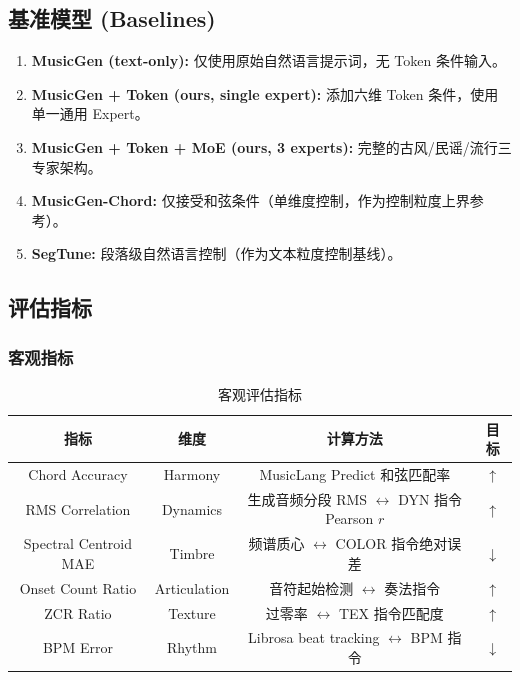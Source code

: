 \documentclass[12pt,a4paper]{article}
\begin{document}
\subsection{基准模型 (Baselines)}

\begin{enumerate}
\item \textbf{MusicGen (text-only):} 仅使用原始自然语言提示词，无 Token 条件输入。
\item \textbf{MusicGen + Token (ours, single expert):} 添加六维 Token 条件，使用单一通用 Expert。
\item \textbf{MusicGen + Token + MoE (ours, 3 experts):} 完整的古风/民谣/流行三专家架构。
\item \textbf{MusicGen-Chord\cite{musicgenchord}:} 仅接受和弦条件（单维度控制，作为控制粒度上界参考）。
\item \textbf{SegTune\cite{segtune}:} 段落级自然语言控制（作为文本粒度控制基线）。
\end{enumerate}

\subsection{评估指标}

\subsubsection{客观指标}

\begin{table}[H]
\centering
\caption{客观评估指标}
\label{tab:metrics}
\begin{tabular}{c|c|c|c}
\toprule
\textbf{指标} & \textbf{维度} & \textbf{计算方法} & \textbf{目标} \\
\midrule
Chord Accuracy & Harmony & MusicLang Predict 和弦匹配率 & $\uparrow$ \\
RMS Correlation & Dynamics & 生成音频分段 RMS $\leftrightarrow$ DYN 指令 Pearson $r$ & $\uparrow$ \\
Spectral Centroid MAE & Timbre & 频谱质心 $\leftrightarrow$ COLOR 指令绝对误差 & $\downarrow$ \\
Onset Count Ratio & Articulation & 音符起始检测 $\leftrightarrow$ 奏法指令 & $\uparrow$ \\
ZCR Ratio & Texture & 过零率 $\leftrightarrow$ TEX 指令匹配度 & $\uparrow$ \\
BPM Error & Rhythm & Librosa beat tracking $\leftrightarrow$ BPM 指令 & $\downarrow$ \\
\bottomrule
\end{tabular}
\end{table}
\end{document}
